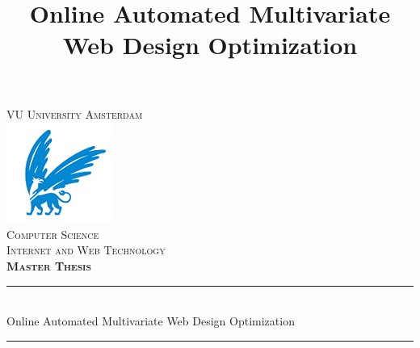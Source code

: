 \documentclass{report}
\begin{document}
\title{Online Automated Multivariate Web Design Optimization}
\begin{titlepage}
	
	\newcommand{\HRule}{\rule{\linewidth}{0.5mm}} %
	
	\center %
	 
	
	\textsc{\LARGE VU University Amsterdam}\\[1.5cm] %
	
	\includegraphics{imgs/vu.png}\\[1cm] %
	 
	\textsc{\Large Computer Science}\\[0.5cm] %
	\textsc{\large Internet and Web Technology}\\[1.0cm] %
	\textsc{\Large  \bfseries Master Thesis}\\[0.5cm]
	
	
	\HRule \\[0.4cm]
	{ \huge Online Automated Multivariate Web Design Optimization}\\[0.1cm] %
	\HRule \\[2.5cm]
	 
	

\end{titlepage}
\end{document}
